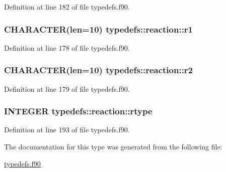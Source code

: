 Definition at line 182 of file typedefs.f90.\hypertarget{typetypedefs_1_1reaction_a8aae4f0307c7f74eff0b848511d08f14}{
\subsubsection[{r1}]{\setlength{\rightskip}{0pt plus 5cm}CHARACTER(len=10) {\bf typedefs::reaction::r1}}}
\label{typetypedefs_1_1reaction_a8aae4f0307c7f74eff0b848511d08f14}


Definition at line 178 of file typedefs.f90.\hypertarget{typetypedefs_1_1reaction_a9371b4d59c6137afcc8816ddd05ff152}{
\subsubsection[{r2}]{\setlength{\rightskip}{0pt plus 5cm}CHARACTER(len=10) {\bf typedefs::reaction::r2}}}
\label{typetypedefs_1_1reaction_a9371b4d59c6137afcc8816ddd05ff152}


Definition at line 179 of file typedefs.f90.\hypertarget{typetypedefs_1_1reaction_a8c84f20b9aa91da88786e437d59eaf93}{
\subsubsection[{rtype}]{\setlength{\rightskip}{0pt plus 5cm}INTEGER {\bf typedefs::reaction::rtype}}}
\label{typetypedefs_1_1reaction_a8c84f20b9aa91da88786e437d59eaf93}


Definition at line 193 of file typedefs.f90.

The documentation for this type was generated from the following file:\begin{DoxyCompactItemize}
\item 
\hyperlink{typedefs_8f90}{typedefs.f90}\end{DoxyCompactItemize}

